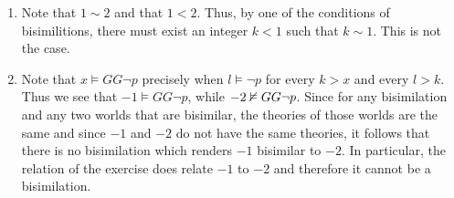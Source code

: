\documentclass{article}
\begin{document}
\begin{ex}
\begin{enumerate}
\item Note that $1\sim 2$ and that $1<2$. Thus, by one of the conditions of bisimilitions, there must exist an integer $k<1$ such that $k\sim 1$. This is not the case.
\item Note that $x\models GG\neg p$ precisely when $l\models\neg p$ for every $k>x$ and every $l>k$. Thus we see that $-1\models GG\neg p$, while $-2\nvDash GG\neg p$. Since for any bisimilation and any two worlds that are bisimilar, the theories of those worlds are the same and since $-1$ and $-2$ do not have the same theories, it follows that there is no bisimilation which renders $-1$ bisimilar to $-2$. In particular, the relation of the exercise does relate $-1$ to $-2$ and therefore it cannot be a bisimilation.
\end{enumerate}
\end{ex}
\end{document}
